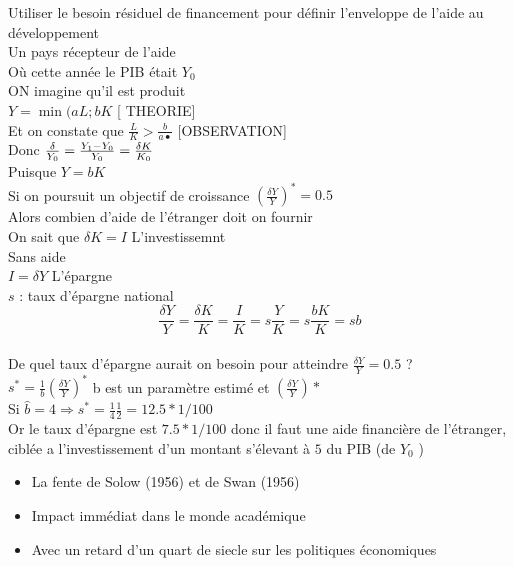 \documentclass{article}
\begin{document}
Utiliser le besoin résiduel de financement pour définir l'enveloppe de l'aide au développement \\
Un pays récepteur de l'aide \\
Où cette année le PIB était \(Y_0\) \\
ON imagine qu'il est produit \\
\(Y = \min (aL ; bK\)  [ THEORIE]\\
Et on constate que \(\frac{L}{K} > \frac{b}{a•}\) [OBSERVATION] \\
Donc \( \frac{\delta}{Y_0} = \frac{Y_1 -Y_0}{Y_0} = \frac{\delta K}{K_0} \newline \) \\
Puisque \(Y = bK\) \\
Si on poursuit un objectif de croissance \((\frac{\delta Y}{Y})^* = 0.5\) \\
Alors combien d'aide de l'étranger doit on fournir\\
On sait que \(\delta K = I\) L'investissemnt\\
Sans aide \\
\(I = \delta Y\) L'épargne \\
\(s\) :  taux d'épargne national \\
\[ \frac{\delta Y}{Y} = \frac{\delta K}{K} = \frac{I}{K} = s \frac{Y}{K} = s \frac{bK}{K} = sb \] \\
De quel taux d'épargne aurait on besoin pour atteindre \( \frac{\delta Y}{Y} = 0.5\) ? \\
\( s^* = \frac{1}{b} (\frac{\delta Y}{Y})^*\) b est un paramètre estimé et \( (\frac{\delta Y}{Y})* \) \\
Si \( \hat{b} = 4 \Rightarrow s^* = \frac{1}{4} \frac{1}{2} = 12.5 * 1/100  \) \\
Or le taux d'épargne est $ 7.5 * 1/100 $ donc il faut une aide financière de l'étranger, ciblée a l'investissement d'un montant s'élevant à $5$ du PIB (de $Y_0$ )
\begin{itemize}
	\item La fente de Solow (1956) et de Swan (1956)
	\item Impact immédiat dans le monde académique
	\item Avec un retard d'un quart de siecle sur les politiques économiques 
\end{itemize}
\end{document}
